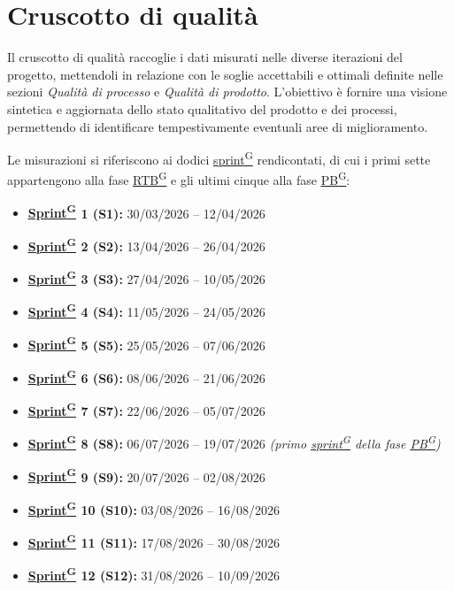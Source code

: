 \documentclass[a4paper,12pt]{article}
\providecommand{\glslink}[2]{\href{https://alittlebyte-19.github.io/Documentazione/glossario.html\#gls-#1}{\underline{#2}\textsuperscript{\scriptsize G}}}
\begin{document}
\section{Cruscotto di qualità}
\label{sec:cruscotto}

Il cruscotto di qualità raccoglie i dati misurati nelle diverse iterazioni del progetto, mettendoli in relazione con le soglie accettabili e ottimali definite nelle sezioni \emph{Qualità di processo} e \emph{Qualità di prodotto}. L'obiettivo è fornire una visione sintetica e aggiornata dello stato qualitativo del prodotto e dei processi, permettendo di identificare tempestivamente eventuali aree di miglioramento.

Le misurazioni si riferiscono ai dodici \glslink{sprint}{sprint} rendicontati, di cui i primi sette appartengono alla fase \glslink{rtb-requirements-and-technology-baseline}{RTB} e gli ultimi cinque alla fase \glslink{pb-product-baseline}{PB}:

\begin{itemize}
    \item \textbf{\glslink{sprint}{Sprint} 1 (S1):} 30/03/2026 – 12/04/2026
    \item \textbf{\glslink{sprint}{Sprint} 2 (S2):} 13/04/2026 – 26/04/2026
    \item \textbf{\glslink{sprint}{Sprint} 3 (S3):} 27/04/2026 – 10/05/2026
    \item \textbf{\glslink{sprint}{Sprint} 4 (S4):} 11/05/2026 – 24/05/2026
    \item \textbf{\glslink{sprint}{Sprint} 5 (S5):} 25/05/2026 – 07/06/2026
    \item \textbf{\glslink{sprint}{Sprint} 6 (S6):} 08/06/2026 – 21/06/2026
    \item \textbf{\glslink{sprint}{Sprint} 7 (S7):} 22/06/2026 – 05/07/2026
    \item \textbf{\glslink{sprint}{Sprint} 8 (S8):} 06/07/2026 – 19/07/2026 \textit{(primo \glslink{sprint}{sprint} della fase \glslink{pb-product-baseline}{PB})}
    \item \textbf{\glslink{sprint}{Sprint} 9 (S9):} 20/07/2026 – 02/08/2026
    \item \textbf{\glslink{sprint}{Sprint} 10 (S10):} 03/08/2026 – 16/08/2026
    \item \textbf{\glslink{sprint}{Sprint} 11 (S11):} 17/08/2026 – 30/08/2026
    \item \textbf{\glslink{sprint}{Sprint} 12 (S12):} 31/08/2026 – 10/09/2026
\end{itemize}
\end{document}
